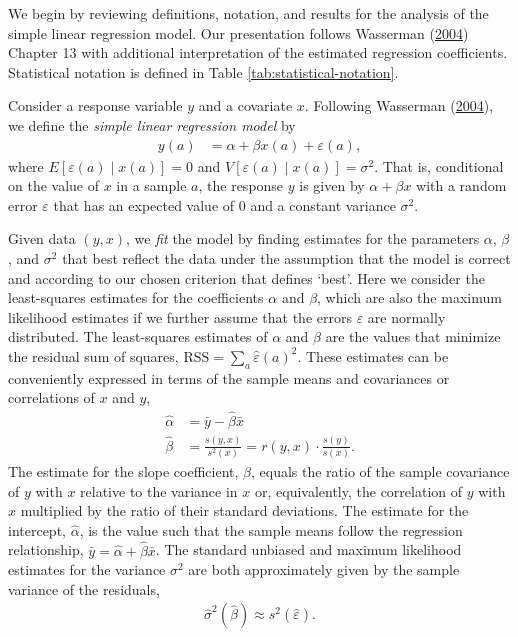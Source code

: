 \documentclass[
]{article}
\begin{document}
We begin by reviewing definitions, notation, and results for the analysis of the simple linear regression model.
Our presentation follows Wasserman (\protect\hyperlink{ref-wasserman2004allo}{2004}) Chapter 13 with additional interpretation of the estimated regression coefficients.
Statistical notation is defined in Table \ref{tab:statistical-notation}.

Consider a response variable \(y\) and a covariate \(x\).
Following Wasserman (\protect\hyperlink{ref-wasserman2004allo}{2004}), we define the \emph{simple linear regression model} by
\begin{align}
  \label{eq:lm}
  y(a) &= \alpha + \beta x(a) + \varepsilon(a),
\end{align}
where \(E[\varepsilon(a) \mid x(a)] = 0\) and \(V[\varepsilon(a) \mid x(a)] = \sigma^2\).
That is, conditional on the value of \(x\) in a sample \(a\), the response \(y\) is given by \(\alpha + \beta x\) with a random error \(\varepsilon\) that has an expected value of \(0\) and a constant variance \(\sigma^2\).

Given data \((y, x)\), we \emph{fit} the model by finding estimates for the parameters \(\alpha\), \(\beta\), and \(\sigma^2\) that best reflect the data under the assumption that the model is correct and according to our chosen criterion that defines `best'.
Here we consider the least-squares estimates for the coefficients \(\alpha\) and \(\beta\), which are also the maximum likelihood estimates if we further assume that the errors \(\varepsilon\) are normally distributed.
The least-squares estimates of \(\alpha\) and \(\beta\) are the values that minimize the residual sum of squares, \(\text{RSS} = \sum_{a} \hat \varepsilon(a)^2\).
These estimates can be conveniently expressed in terms of the sample means and covariances or correlations of \(x\) and \(y\),
\begin{align}
  \label{eq:lm-hat}
  \hat \alpha &= \bar y - \hat \beta \bar x \\
  \hat \beta &= \frac{s(y,x)}{s^2(x)} = r(y,x) \cdot \frac{s(y)}{s(x)}.
\end{align}
The estimate for the slope coefficient, \(\hat \beta\), equals the ratio of the sample covariance of \(y\) with \(x\) relative to the variance in \(x\) or, equivalently, the correlation of \(y\) with \(x\) multiplied by the ratio of their standard deviations.
The estimate for the intercept, \(\hat \alpha\), is the value such that the sample means follow the regression relationship, \(\bar y = \hat \alpha + \hat \beta \bar x\).
The standard unbiased and maximum likelihood estimates for the variance \(\sigma^{2}\) are both approximately given by the sample variance of the residuals,
\begin{align}
  \label{eq:lm-var}
  \hat{\sigma}^2(\hat \beta) \approx s^2(\hat \varepsilon).
\end{align}
\end{document}
